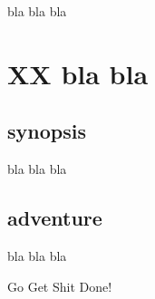 bla bla bla






























































\newpage
\section*{XX bla bla}


\subsection*{synopsis}

bla bla bla


\subsection*{adventure}

bla bla bla

\begin{readoutloud}
Go Get Shit Done!
\end{readoutloud}


